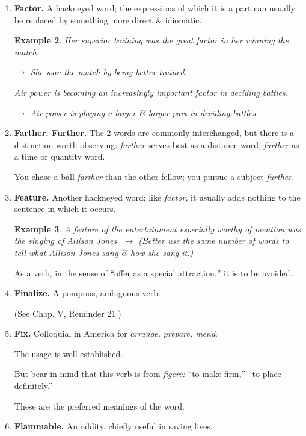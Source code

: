 \documentclass{article}
\newtheorem{example}{Example}
\begin{document}
\begin{enumerate}
\begin{example}
		$\to$ Parents complained bitterly about the fire hazard in the wooden schoolhouse.
		
		He has been appointed warden of the new facility.
		
		$\to$ He has been appointed warden of the new prison.
	\end{example}
	\item {\bf Factor.} A hackneyed word; the expressions of which it is a part can usually be replaced by something more direct \& idiomatic.
	\begin{example}
		Her superior training was the great factor in her winning the match.
		
		$\to$ She won the match by being better trained.
		
		Air power is becoming an increasingly important factor in deciding battles.
		
		$\to$ Air power is playing a larger \& larger part in deciding battles.
	\end{example}
	\item {\bf Farther. Further.} The 2 words are commonly interchanged, but there is a distinction worth observing: {\it farther} serves best as a distance word, {\it further} as a time or quantity word.
	
	You chase a ball {\it farther} than the other fellow; you pursue a subject {\it further}.
	\item {\bf Feature.} Another hackneyed word; like {\it factor}, it usually adds nothing to the sentence in which it occurs.
	\begin{example}
		A feature of the entertainment especially worthy of mention was the singing of Allison Jones.
		$\to$ (Better use the same number of words to tell what Allison Jones sang \& how she sang it.)
	\end{example}
	As a verb, in the sense of ``offer as a special attraction,'' it is to be avoided.
	\item {\bf Finalize.} A pompous, ambiguous verb.
	
	(See Chap. V, Reminder 21.)
	\item {\bf Fix.} Colloquial in America for {\it arrange, prepare, mend}.
	
	The usage is well established.
	
	But bear in mind that this verb is from {\it figere:} ``to make firm,'' ``to place definitely.''
	
	These are the preferred meanings of the word.
	\item {\bf Flammable.} An oddity, chiefly useful in saving lives.
	

\end{enumerate}
\end{document}
